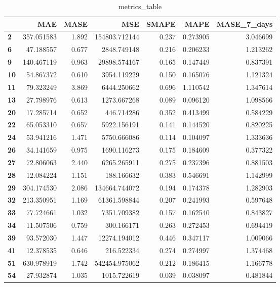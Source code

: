 \begin{table}[h]
\centering
\caption{metrics_table}
\label{table:Dataset 1. Experiment with tuned values}
\begin{tabular}{lrrrrrr}
\toprule
{} &         MAE &   MASE &            MSE &  SMAPE &      MAPE &  MASE\_7\_days \\
\midrule
\textbf{2 } &  357.051583 &  1.892 &  154803.712144 &  0.237 &  0.273905 &     3.046699 \\
\textbf{6 } &   47.188557 &  0.677 &    2848.749148 &  0.216 &  0.206233 &     1.213262 \\
\textbf{9 } &  140.467119 &  0.963 &   29898.574167 &  0.165 &  0.147449 &     0.837391 \\
\textbf{10} &   54.867372 &  0.610 &    3954.119229 &  0.150 &  0.165076 &     1.121324 \\
\textbf{11} &   79.323249 &  3.869 &    6444.250662 &  0.696 &  1.110542 &     1.347614 \\
\textbf{13} &   27.798976 &  0.613 &    1273.667268 &  0.089 &  0.096120 &     1.098566 \\
\textbf{20} &   17.285714 &  0.652 &     446.714286 &  0.352 &  0.413499 &     0.584229 \\
\textbf{22} &   65.053310 &  0.657 &    5922.156191 &  0.141 &  0.144520 &     0.820225 \\
\textbf{24} &   53.941216 &  1.471 &    5750.666086 &  0.114 &  0.104097 &     1.333636 \\
\textbf{26} &   34.141659 &  0.975 &    1690.116273 &  0.175 &  0.184609 &     0.377322 \\
\textbf{27} &   72.806063 &  2.440 &    6265.265911 &  0.275 &  0.237396 &     0.881503 \\
\textbf{28} &   12.084224 &  1.151 &     188.166632 &  0.383 &  0.546691 &     1.142999 \\
\textbf{29} &  304.174530 &  2.086 &  134664.744072 &  0.194 &  0.174378 &     1.282903 \\
\textbf{32} &  213.350951 &  1.169 &   61361.598844 &  0.207 &  0.241993 &     0.597648 \\
\textbf{33} &   77.724661 &  1.032 &    7351.709382 &  0.157 &  0.162540 &     0.843827 \\
\textbf{34} &   11.507506 &  0.759 &     300.166171 &  0.263 &  0.272453 &     0.694419 \\
\textbf{39} &   93.572030 &  1.447 &   12274.194012 &  0.446 &  0.347117 &     1.009066 \\
\textbf{41} &   12.378535 &  0.646 &     216.522334 &  0.274 &  0.274997 &     1.374468 \\
\textbf{51} &  630.978919 &  1.742 &  542454.975062 &  0.212 &  0.186415 &     1.166778 \\
\textbf{54} &   27.932874 &  1.035 &    1015.722619 &  0.039 &  0.038097 &     0.481844 \\
\bottomrule
\end{tabular}
\end{table}
